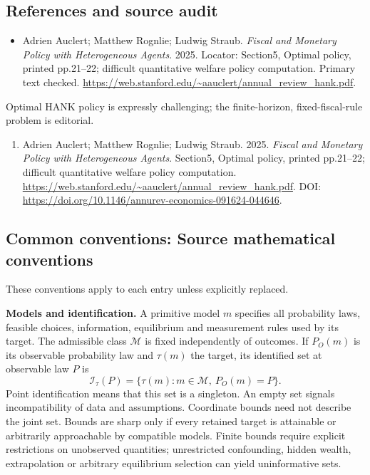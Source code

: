 \documentclass[11pt,a4paper]{article}
\begin{document}
\subsection*{References and source audit}
\begin{itemize}
\item Adrien Auclert; Matthew Rognlie; Ludwig Straub. \emph{Fiscal and Monetary Policy with Heterogeneous Agents}. 2025. Locator: Section5, Optimal policy, printed pp.21--22; difficult quantitative welfare policy computation. Primary text checked. \url{https://web.stanford.edu/~aauclert/annual_review_hank.pdf}.
\end{itemize}
Optimal HANK policy is expressly challenging; the finite-horizon, fixed-fiscal-rule problem is editorial.
\begin{enumerate}\raggedright
\item\hypertarget{definitions:source:30007530:1}{} Adrien Auclert; Matthew Rognlie; Ludwig Straub. 2025. \emph{Fiscal and Monetary Policy with Heterogeneous Agents}. Section5, Optimal policy, printed pp.21--22; difficult quantitative welfare policy computation.
\url{https://web.stanford.edu/~aauclert/annual_review_hank.pdf}.
DOI: \url{https://doi.org/10.1146/annurev-economics-091624-044646}.
\end{enumerate}

\subsection*{Common conventions: Source mathematical conventions}

These conventions apply to each entry unless explicitly replaced.

\textbf{Models and identification.} A primitive model \(m\) specifies all probability laws, feasible choices, information, equilibrium and measurement rules used by its target. The admissible class \(\mathcal M\) is fixed independently of outcomes. If \(P_O(m)\) is its observable probability law and \(\tau(m)\) the target, its identified set at observable law \(P\) is
\[
 \mathcal I_\tau(P)=\{\tau(m):m\in\mathcal M,\ P_O(m)=P\}.
\]
Point identification means that this set is a singleton. An empty set signals incompatibility of data and assumptions. Coordinate bounds need not describe the joint set. Bounds are sharp only if every retained target is attainable or arbitrarily approachable by compatible models. Finite bounds require explicit restrictions on unobserved quantities; unrestricted confounding, hidden wealth, extrapolation or arbitrary equilibrium selection can yield uninformative sets.
\end{document}
